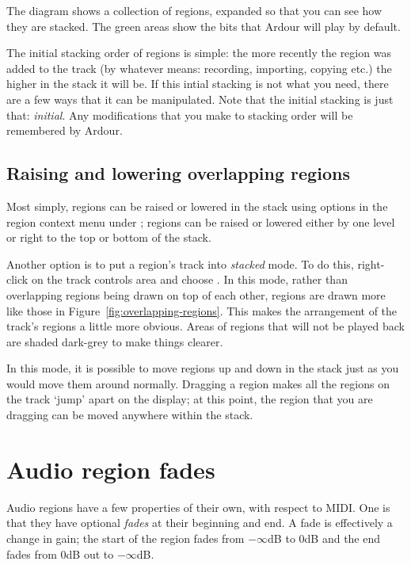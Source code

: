 \documentclass[10pt,a4paper]{book}
\newcommand{\menu}[1]{\emph{\StrSubstitute{#1}{,}{ $\rightarrow$ }}}
\begin{document}
{The diagram shows a collection of regions, expanded so that you can
see how they are stacked.  The green areas show the bits that Ardour
will play by default.

The initial stacking order of regions is simple: the more recently the
region was added to the track (by whatever means: recording,
importing, copying etc.) the higher in the stack it will be.  If this
intial stacking is not what you need, there are a few ways that it can
be manipulated.  Note that the initial stacking is just that:
\emph{initial}.  Any modifications that you make to stacking order
will be remembered by Ardour.



\subsection{Raising and lowering overlapping regions}

Most simply, regions can be raised or lowered in the stack using
options in the region context menu under \menu{Layering}; regions can
be raised or lowered either by one level or right to the top or bottom
of the stack.

Another option is to put a region's track into \emph{stacked} mode.
To do this, right-click on the track controls area and choose
\menu{Layers,Stacked}.  In this mode, rather than overlapping regions
being drawn on top of each other, regions are drawn more like those in
Figure~\ref{fig:overlapping-regions}.  This makes the arrangement of
the track's regions a little more obvious.  Areas of regions that will
not be played back are shaded dark-grey to make things clearer.

In this mode, it is possible to move regions up and down in the stack
just as you would move them around normally.  Dragging a region makes
all the regions on the track `jump' apart on the display; at this
point, the region that you are dragging can be moved anywhere within
the stack.



\section{Audio region fades}

Audio regions have a few properties of their own, with respect to
MIDI\@.  One is that they have optional \emph{fades} at their
beginning and end.  A fade is effectively a change in gain; the start
of the region fades from $-\infty$dB to $0$dB and the end fades from
$0$dB out to $-\infty$dB.  

}
\end{document}
